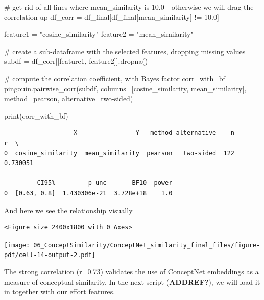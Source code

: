 \documentclass[
  letterpaper,
  DIV=11,
  numbers=noendperiod]{scrreprt}
\newenvironment{Shaded}{\begin{snugshade}}{\end{snugshade}}
\newcommand{\BuiltInTok}[1]{\textcolor[rgb]{0.00,0.23,0.31}{#1}}
\newcommand{\CommentTok}[1]{\textcolor[rgb]{0.37,0.37,0.37}{#1}}
\newcommand{\FloatTok}[1]{\textcolor[rgb]{0.68,0.00,0.00}{#1}}
\newcommand{\NormalTok}[1]{\textcolor[rgb]{0.00,0.23,0.31}{#1}}
\newcommand{\OperatorTok}[1]{\textcolor[rgb]{0.37,0.37,0.37}{#1}}
\newcommand{\StringTok}[1]{\textcolor[rgb]{0.13,0.47,0.30}{#1}}
\begin{document}
\begin{Shaded}
\begin{Highlighting}[]
\CommentTok{\# get rid of all lines where mean\_similarity is 10.0 {-} otherwise we will drag the correlation up}
\NormalTok{df\_corr }\OperatorTok{=}\NormalTok{ df\_final[df\_final[}\StringTok{\textquotesingle{}mean\_similarity\textquotesingle{}}\NormalTok{] }\OperatorTok{!=} \FloatTok{10.0}\NormalTok{]}

\NormalTok{feature1 }\OperatorTok{=} \StringTok{"cosine\_similarity"}
\NormalTok{feature2 }\OperatorTok{=} \StringTok{"mean\_similarity"}

\CommentTok{\# create a sub{-}dataframe with the selected features, dropping missing values}
\NormalTok{subdf }\OperatorTok{=}\NormalTok{ df\_corr[[feature1, feature2]].dropna()}

\CommentTok{\# compute the correlation coefficient, with Bayes factor}
\NormalTok{corr\_with\_bf }\OperatorTok{=}\NormalTok{ pingouin.pairwise\_corr(subdf, columns}\OperatorTok{=}\NormalTok{[}\StringTok{\textquotesingle{}cosine\_similarity\textquotesingle{}}\NormalTok{, }\StringTok{\textquotesingle{}mean\_similarity\textquotesingle{}}\NormalTok{], method}\OperatorTok{=}\StringTok{\textquotesingle{}pearson\textquotesingle{}}\NormalTok{, alternative}\OperatorTok{=}\StringTok{\textquotesingle{}two{-}sided\textquotesingle{}}\NormalTok{)}

\BuiltInTok{print}\NormalTok{(corr\_with\_bf)}
\end{Highlighting}
\end{Shaded}

\begin{verbatim}
                   X                Y   method alternative    n         r  \
0  cosine_similarity  mean_similarity  pearson   two-sided  122  0.730051   

         CI95%         p-unc       BF10  power  
0  [0.63, 0.8]  1.430306e-21  3.728e+18    1.0  
\end{verbatim}

And here we see the relationship visually

\begin{verbatim}
<Figure size 2400x1800 with 0 Axes>
\end{verbatim}

\texttt{[image: 06\_ConceptSimilarity/ConceptNet\_similarity\_final\_files/figure-pdf/cell-14-output-2.pdf]}

The strong correlation (r=0.73) validates the use of ConceptNet
embeddings as a measure of conceptual similarity. In the next script
(\textbf{ADDREF?}), we will load it in together with our effort
features.
\end{document}
